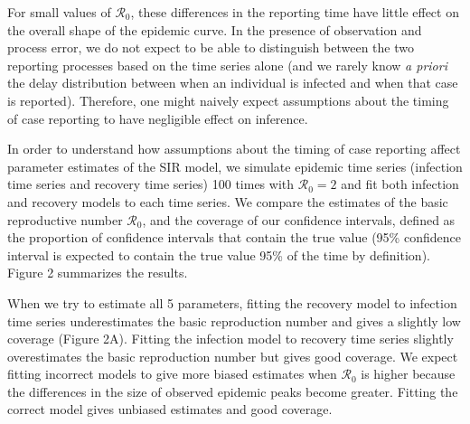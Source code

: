 \documentclass[12pt]{article}\usepackage[]{graphicx}\usepackage[]{color}
\begin{document}
For small values of $\mathcal R_0$, 
these differences in the reporting time have little effect on the overall shape 
of the epidemic curve. In the presence of observation and process error, we
do not expect to be able to distinguish between the two reporting processes
based on the time series alone (and we rarely know \emph{a priori} the delay distribution between when an individual is infected and when that case is reported).
Therefore, one might naively expect assumptions about the timing of case reporting to have negligible effect on inference.

In order to understand how assumptions about the timing of case reporting affect 
parameter estimates of the SIR model, we simulate epidemic time series
(infection time series and recovery time series) 
100 times with $\mathcal R_0 = 2$ and fit both infection and recovery models to each 
time series. We compare the estimates of the basic reproductive number $\mathcal R_0$,
and the coverage of our confidence intervals, defined as the proportion of confidence intervals that
contain the true value (95\% confidence interval is expected to contain the true value
95\% of the time by definition). Figure 2 summarizes the results.

When we try to estimate all 5 parameters, fitting the recovery model to
infection time series underestimates the basic reproduction number and 
gives a slightly low coverage (Figure 2A). 
Fitting the infection model to recovery
time series slightly overestimates the basic reproduction number but gives 
good coverage. 
We expect fitting incorrect models to give more biased estimates when $\mathcal R_0$ is higher because the differences in the size of observed epidemic peaks become greater.
Fitting the correct model gives unbiased estimates and good coverage.
\end{document}
